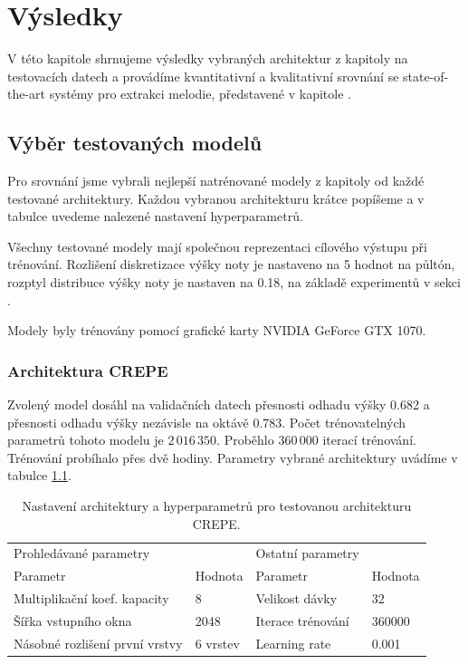\chapter{Výsledky}\label{cha:vysledky}

V této kapitole shrnujeme výsledky vybraných architektur z kapitoly  na testovacích datech a provádíme kvantitativní a kvalitativní srovnání se state-of-the-art systémy pro extrakci melodie, představené v kapitole .

\section{Výběr testovaných modelů}

Pro srovnání jsme vybrali nejlepší natrénované modely z kapitoly  od každé testované architektury. Každou vybranou architekturu krátce popíšeme a v tabulce uvedeme nalezené nastavení hyperparametrů.

Všechny testované modely mají společnou reprezentaci cílového výstupu při trénování. Rozlišení diskretizace výšky noty je nastaveno na 5 hodnot na půltón, rozptyl distribuce výšky noty je nastaven na 0.18, na základě experimentů v sekci .

Modely byly trénovány pomocí grafické karty NVIDIA GeForce GTX 1070.

\subsection{Architektura CREPE}

Zvolený model dosáhl na validačních datech přesnosti odhadu výšky 0.682 a přesnosti odhadu výšky nezávisle na oktávě 0.783. Počet trénovatelných parametrů tohoto modelu je $2\,016\,350$. Proběhlo $360\,000$ iterací trénování. Trénování probíhalo přes dvě hodiny. Parametry vybrané architektury uvádíme v tabulce \ref{tab:crepe_hyperparams}.

\begin{table}[p]
\centering
\begin{tabular}{llll}
\toprule
Prohledávané parametry               &          & Ostatní parametry &         \\
Parametr                             & Hodnota  & Parametr          & Hodnota \\
\midrule
Multiplikační koef. kapacity         & 8        & Velikost dávky    & 32      \\
Šířka vstupního okna                 & 2048     & Iterace trénování & 360000         \\
Násobné rozlišení první vrstvy       & 6 vrstev & Learning rate     & 0.001   \\
\bottomrule
\end{tabular}
\caption{Nastavení architektury a hyperparametrů pro testovanou architekturu CREPE.}\label{tab:crepe_hyperparams}
\end{table}


